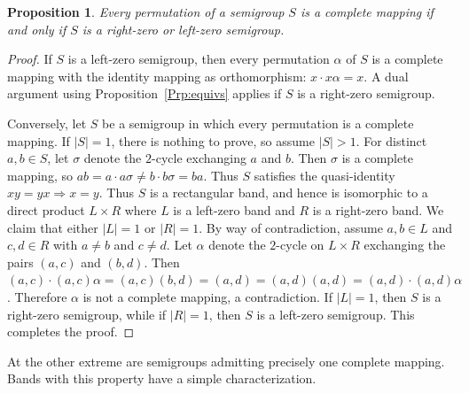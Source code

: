 \documentclass[11pt]{article}
\theoremstyle{plain}
\newtheorem{prop}[theorem]{Proposition}
\theoremstyle{remark}
\theoremstyle{definition}
\theoremstyle{plain}
\begin{document}
\begin{prop}\label{Prp:every_perm}
Every permutation of a semigroup $S$ is a complete mapping if and only if $S$ is a right-zero or left-zero semigroup.
\end{prop}
\begin{proof}
If $S$ is a left-zero semigroup, then every permutation $\alpha$ of $S$ is a complete mapping with the identity mapping as orthomorphism: $x\cdot x\alpha = x$. A dual argument using Proposition~\ref{Prp:equivs} applies if $S$ is a right-zero semigroup.

Conversely, let $S$ be a semigroup in which every permutation is a complete mapping. If $|S| = 1$, there is nothing to prove, so assume $|S| > 1$. For distinct $a,b\in S$, let $\sigma$ denote the $2$-cycle exchanging $a$ and $b$. Then $\sigma$ is a complete mapping, so $a b = a\cdot a\sigma \ne b\cdot b\sigma = b a$. Thus $S$ satisfies the quasi-identity $xy = yx \Rightarrow x=y$. Thus $S$ is a rectangular band, and hence is isomorphic to a direct product $L\times R$ where $L$ is a left-zero band and $R$ is a right-zero band. We claim that either $|L| = 1$ or $|R| = 1$. By way of contradiction, assume $a,b\in L$ and $c,d\in R$ with $a\ne b$ and $c\ne d$. Let $\alpha$ denote the $2$-cycle on $L\times R$ exchanging the pairs $(a,c)$ and $(b,d)$. Then $(a,c)\cdot (a,c)\alpha = (a,c)(b,d) = (a,d) = (a,d)(a,d) = (a,d)\cdot (a,d)\alpha$. Therefore $\alpha$ is not a complete mapping, a contradiction. If $|L|=1$, then $S$ is a right-zero semigroup, while if $|R|=1$, then $S$ is a left-zero semigroup. This completes the proof.
\end{proof}

At the other extreme are semigroups admitting precisely one complete mapping. Bands with this property have a simple characterization.
\end{document}
